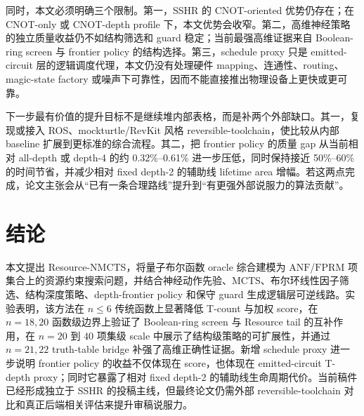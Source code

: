 \documentclass[UTF8,fontset=macnew,11pt]{ctexart}
\newcommand{\method}{Resource-NMCTS}
\newcommand{\screen}{Boolean-ring screen}
\newcommand{\anf}{\ensuremath{\mathrm{ANF}}}
\newcommand{\fprm}{\ensuremath{\mathrm{FPRM}}}
\newcommand{\mcts}{\ensuremath{\mathrm{MCTS}}}
\begin{document}
同时，本文必须明确三个限制。第一，SSHR 的 CNOT-oriented 优势仍存在；在 CNOT-only 或 CNOT-depth profile 下，本文优势会收窄。第二，高维神经策略的独立质量收益仍不如结构筛选和 guard 稳定；当前最强高维证据来自 Boolean-ring screen 与 frontier policy 的结构选择。第三，schedule proxy 只是 emitted-circuit 层的逻辑调度代理，本文仍没有处理硬件 mapping、连通性、routing、magic-state factory 或噪声下可靠性，因而不能直接推出物理设备上更快或更可靠。

下一步最有价值的提升目标不是继续堆内部表格，而是补两个外部缺口。其一，复现或接入 ROS、mockturtle/RevKit 风格 reversible-toolchain，使比较从内部 baseline 扩展到更标准的综合流程。其二，把 frontier policy 的质量 gap 从当前相对 all-depth 或 depth-4 的约 0.32\%--0.61\% 进一步压低，同时保持接近 50\%--60\% 的时间节省，并减少相对 fixed depth-2 的辅助线 lifetime area 增幅。若这两点完成，论文主张会从“已有一条合理路线”提升到“有更强外部说服力的算法贡献”。

\section{结论}

本文提出 \method{}，将量子布尔函数 oracle 综合建模为 \anf{}/\fprm{} 项集合上的资源约束搜索问题，并结合神经动作先验、\mcts{}、布尔环线性因子筛选、结构深度策略、depth-frontier policy 和保守 guard 生成逻辑层可逆线路。实验表明，该方法在 $n\leq6$ 传统函数上显著降低 T-count 与加权 score，在 $n=18,20$ 函数级边界上验证了 \screen{} 与 Resource tail 的互补作用，在 $n=20$ 到 $40$ 项集级 scale 中展示了结构级策略的可扩展性，并通过 $n=21,22$ truth-table bridge 补强了高维正确性证据。新增 schedule proxy 进一步说明 frontier policy 的收益不仅体现在 score，也体现在 emitted-circuit T-depth proxy；同时它暴露了相对 fixed depth-2 的辅助线生命周期代价。当前稿件已经形成独立于 SSHR 的投稿主线，但最终论文仍需外部 reversible-toolchain 对比和真正后端相关评估来提升审稿说服力。
\end{document}
